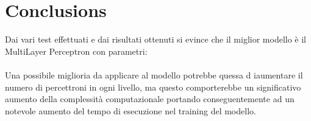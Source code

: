 \section{Conclusions}

        Dai vari test effettuati e dai risultati ottenuti si evince che il miglior modello è il MultiLayer Perceptron con parametri:
        \\ \\
        Una possibile miglioria da applicare al modello potrebbe quessa d iaumentare il numero di percettroni in ogni livello, ma questo comporterebbe un significativo aumento della complessità computazionale portando conseguentemente ad un notevole aumento del tempo di esecuzione nel training del modello.